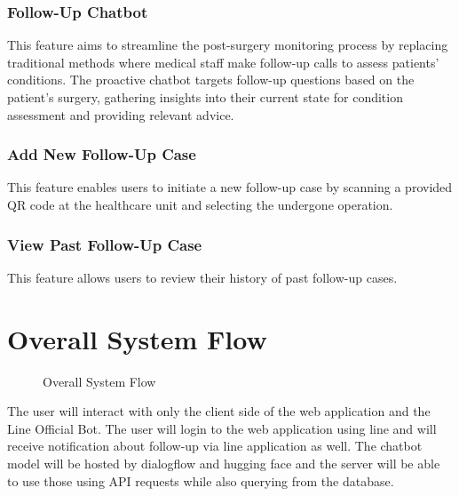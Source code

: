 \documentclass[12pt,oneside,openright,a4paper]{cpe-english-project}
\begin{document}
      \subsubsection{Follow-Up Chatbot}
      \qquad This feature aims to streamline the post-surgery monitoring process by replacing traditional methods where medical staff make follow-up calls to assess patients' conditions. The proactive chatbot targets follow-up questions based on the patient’s surgery, gathering insights into their current state for condition assessment and providing relevant advice. \par
      \subsubsection{Add New Follow-Up Case}
      \qquad This feature enables users to initiate a new follow-up case by scanning a provided QR code at the healthcare unit and selecting the undergone operation. \par
      \subsubsection{View Past Follow-Up Case}
      \qquad This feature allows users to review their history of past follow-up cases. 

  \section{Overall System Flow}
    \begin{figure}[!h]
      \centering
      \caption{Overall System Flow}\label{fig:Overall_System_Flow}
    \end{figure}
    \qquad The user will interact with only the client side of the web application and the Line Official Bot. The user will login to the web application using line and will receive notification about follow-up via line application as well. The chatbot model will be hosted by dialogflow and hugging face and the server will be able to use those using API requests while also querying from the database. \par
\end{document}
